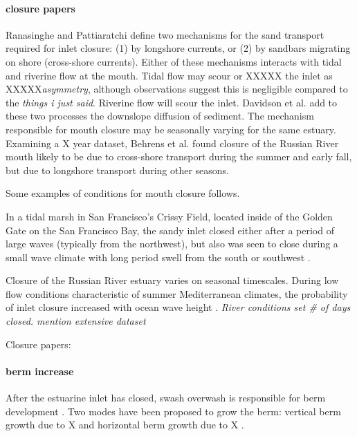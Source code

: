 \paragraph{closure papers} 
Ranasinghe and Pattiaratchi \parencite*{ranasinghe_seasonal_2003} define two mechanisms for the sand transport required for inlet closure: (1) by longshore currents, or (2) by sandbars migrating on shore (cross-shore currents). Either of these mechanisms interacts  with tidal and riverine flow at the mouth. Tidal flow may scour or XXXXX the inlet as XXXXX\emph{asymmetry}, although observations suggest this is negligible compared to the \emph{things i just said}. Riverine flow will scour the inlet.  Davidson et al. \parencite*{davidson_simple_2009} add to these two processes the downslope diffusion of sediment. The mechanism responsible for mouth closure may be seasonally varying for the same estuary. Examining a X year dataset, Behrens et al. \parencite*{behrens_episodic_2013} found closure of the Russian River mouth likely to be due to cross-shore transport during the summer and early fall, but due to longshore transport during other seasons.

Some examples of conditions for mouth closure follows. 

In a tidal marsh in San Francisco's Crissy Field, located inside of the Golden Gate on the San Francisco Bay, the sandy inlet closed either after a period of large waves (typically from the northwest), but also was seen to close during a small wave climate with long period swell from the south or southwest \parencite{hanes_waves_2011}. 

Closure of the Russian River estuary varies on seasonal timescales. During low flow conditions characteristic of summer Mediterranean climates, the probability of inlet closure increased with ocean wave height \parencite{behrens_episodic_2013}. \emph{River conditions set \# of days closed. mention extensive dataset}

Closure papers: \parencite{ranasinghe_seasonal_2003, elwany_opening_1998}

\paragraph{berm increase}
After the estuarine inlet has closed, swash overwash is responsible for berm development \parencite{baldock_morphodynamic_2008}. Two modes have been proposed to grow the berm: vertical berm growth due to X and horizontal berm growth due to X \parencite{weir_beach_2006}. 

